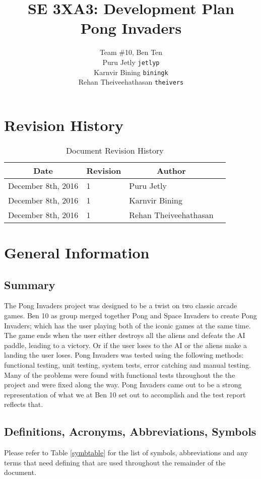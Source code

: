 \documentclass[12pt, oneside]{article}
\title{SE 3XA3: Development Plan\\Pong Invaders}
\author{Team \#10, Ben Ten
		\\ Puru Jetly	\texttt{jetlyp}
		\\ Karnvir Bining	\texttt{biningk}
		\\ Rehan Theiveehathasan	\texttt{theivers}
}
\date{}
\begin{document}
\maketitle
\newpage
\tableofcontents
\newpage
\listoffigures
\newpage
\listoftables
\newpage


\section{Revision History}

\begin{table}[h]
\centering
\caption{Document Revision History}
\label{revhist}
\begin{tabular}{| l | l | l | l |}
\hline
\multicolumn{1}{|c|}{Date} & \multicolumn{1}{c|}{Revision} & \multicolumn{1}{c|}{Author}  \\
\hline
December 8th, 2016 & 1 & Puru Jetly \\
\hline
December 8th, 2016 & 1 & Karnvir Bining \\
\hline
December 8th, 2016 & 1 & Rehan Theiveehathasan \\
\hline
\end{tabular}
\end{table}

\section{General Information}
\subsection{Summary}
The Pong Invaders project was designed to be a twist on two classic arcade games. Ben 10 as group merged together Pong and Space Invaders to create Pong Invaders; which has the user playing both of the iconic games at the same time. The game ends when the user either destroys all the aliens and defeats the AI paddle,  leading to a victory. Or if the user loses to the AI or the aliens make a landing the user loses. Pong Invaders was tested using the following methods: functional testing, unit testing, system tests, error catching and manual testing. Many of the problems were found with functional tests throughout the the project and were fixed along the way. Pong Invaders came out to be a strong representation of what we at Ben 10 set out to accomplish and the test report reflects that. 

\subsection{Definitions, Acronyms, Abbreviations, Symbols}
Please refer to Table \ref{symbtable} for the list of symbols, abbreviations and any 
terms that need defining that are used throughout the remainder of the document. 
\end{document}
